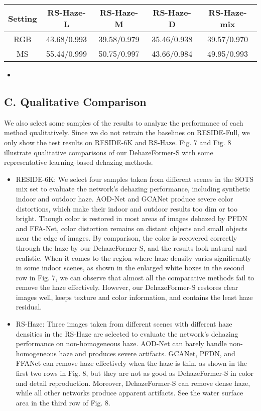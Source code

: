 \documentclass{article}
\begin{document}
\begin{tabular}{|c|c|c|c|c|}\hline
Setting & RS-Haze-L & RS-Haze-M & RS-Haze-D & RS-Haze-mix \\ \hline
RGB & 43.68/0.993 & 39.58/0.979 & 35.46/0.938 & 39.57/0.970 \\ \hline
MS & 55.44/0.999 & 50.75/0.997 & 43.66/0.984 & 49.95/0.993 \\ \hline
\end{tabular}
\begin{itemize}
\item %

\end{itemize}

\subsection{C. Qualitative Comparison}


We also select some samples of the results to analyze the performance of each method qualitatively. Since we do not retrain the baselines on RESIDE-Full, we only show the test results on RESIDE-6K and RS-Haze. Fig. 7 and Fig. 8 illustrate qualitative comparisons of our DehazeFormer-S with some representative learning-based dehazing methods.


\begin{itemize}
\item RESIDE-6K: We select four samples taken from different scenes in the SOTS mix set to evaluate the network’s dehazing performance, including synthetic indoor and outdoor haze. AOD-Net and GCANet produce severe color distortions, which make their indoor and outdoor results too dim or too bright. Though color is restored in most areas of images dehazed by PFDN and FFA-Net, color distortion remains on distant objects and small objects near the edge of images. By comparison, the color is recovered correctly through the haze by our DehazeFormer-S, and the results look natural and realistic. When it comes to the region where haze density varies significantly in some indoor scenes, as shown in the enlarged white boxes in the second row in Fig. 7, we can observe that almost all the comparative methods fail to remove the haze effectively. However, our DehazeFormer-S restores clear images well, keeps texture and color information, and contains the least haze residual.


\item RS-Haze: Three images taken from different scenes with different haze densities in the RS-Haze are selected to evaluate the network’s dehazing performance on non-homogeneous haze. AOD-Net can barely handle non-homogeneous haze and produces severe artifacts. GCANet, PFDN, and FFANet can remove haze effectively when the haze is thin, as shown in the first two rows in Fig. 8, but they are not as good as DehazeFormer-S in color and detail reproduction. Moreover, DehazeFormer-S can remove dense haze, while all other networks produce apparent artifacts. See the water surface area in the third row of Fig. 8.


\end{itemize}
\end{document}
